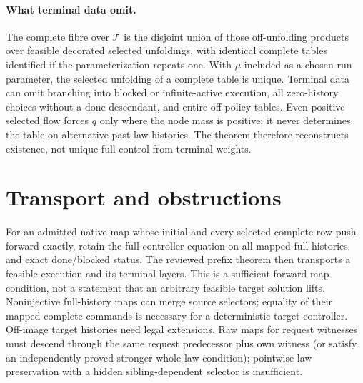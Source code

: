\documentclass[11pt]{article}
\begin{document}
\paragraph{What terminal data omit.}
The complete fibre over $\mathcal T$ is the disjoint union of those off-unfolding products over feasible decorated selected unfoldings, with identical complete tables identified if the parameterization repeats one. With $\mu$ included as a chosen-run parameter, the selected unfolding of a complete table is unique. Terminal data can omit branching into blocked or infinite-active execution, all zero-history choices without a done descendant, and entire off-policy tables. Even positive selected flow forces $q$ only where the node mass is positive; it never determines the table on alternative past-law histories. The theorem therefore reconstructs existence, not unique full control from terminal weights.

\section{Transport and obstructions}
For an admitted native map whose initial and every selected complete row push forward exactly, retain the full controller equation on all mapped full histories and exact done/blocked status. The reviewed prefix theorem then transports a feasible execution and its terminal layers. This is a sufficient forward map condition, not a statement that an arbitrary feasible target solution lifts. Noninjective full-history maps can merge source selectors; equality of their mapped complete commands is necessary for a deterministic target controller. Off-image target histories need legal extensions. Raw maps for request witnesses must descend through the same request predecessor plus own witness (or satisfy an independently proved stronger whole-law condition); pointwise law preservation with a hidden sibling-dependent selector is insufficient.
\end{document}
